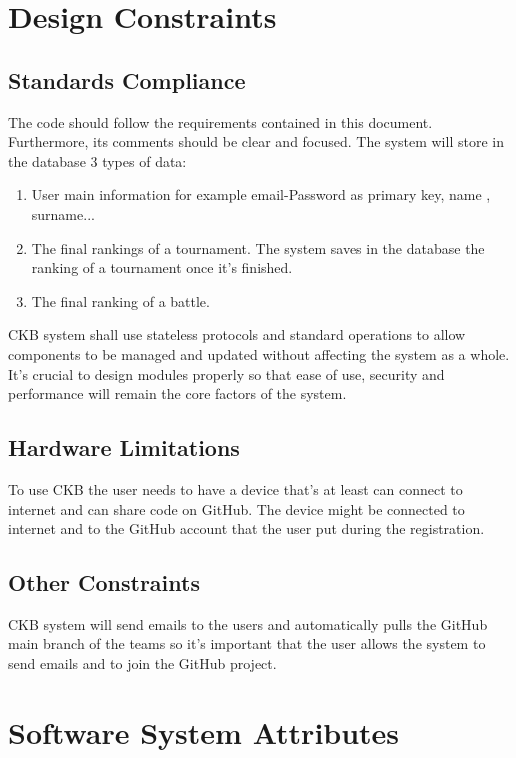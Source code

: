 \section{Design Constraints}
\subsection{Standards Compliance}
The code should follow the requirements contained in this document. Furthermore, its comments should
be clear and focused.
The system will store in the database 3 types of data:
\begin{enumerate}
    \item User main information for example email-Password as primary key, name , surname...
    \item The final rankings of a tournament. The system saves in the database the ranking of a tournament once it's finished.
    \item The final ranking of a battle.
\end{enumerate}

CKB system shall use stateless protocols and standard operations to allow components to
be managed and updated without affecting the system as a whole.
It’s crucial to design modules properly so that ease of use, security and performance will
remain the core factors of the system.
\subsection{Hardware Limitations}
To use CKB the user needs to have a device that's at least can connect to internet and can share code on GitHub.
The device might be connected to internet and to the GitHub account that the user put during the registration. 
\subsection{Other Constraints}
CKB system will send emails to the users and automatically pulls the GitHub main branch of the teams so it's important that the user allows the system to send emails and to join the GitHub project.

\section{Software System Attributes}
